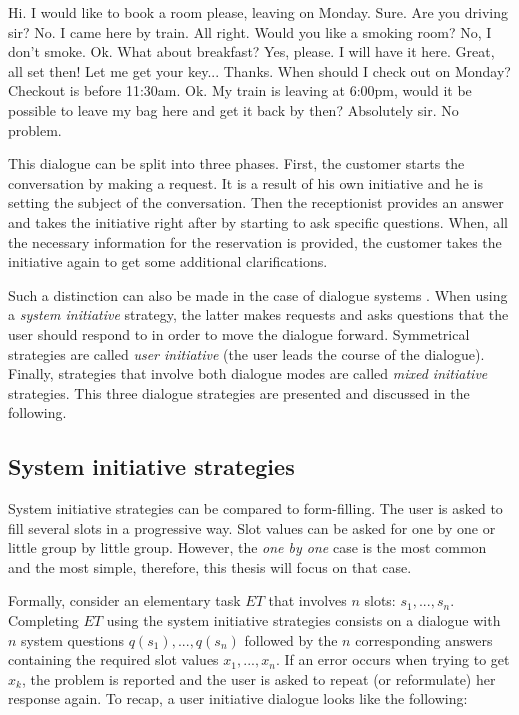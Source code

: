 	\begin{dialogue}
		 Hi. I would like to book a room please, leaving on Monday.
		 Sure. Are you driving sir?
		 No. I came here by train.
		 All right. Would you like a smoking room?
		 No, I don't smoke.
		 Ok. What about breakfast?
		 Yes, please. I will have it here.
		 Great, all set then! Let me get your key...
		 Thanks. When should I check out on Monday?
		 Checkout is before 11:30am.
		 Ok. My train is leaving at 6:00pm, would it be possible to leave my bag here and get it back by then?
		 Absolutely sir. No problem.
	\end{dialogue}

	This dialogue can be split into three phases. First, the customer starts the conversation by making a request. It is a result of his own initiative and he is setting the subject of the conversation. Then the receptionist provides an answer and takes the initiative right after by starting to ask specific questions. When, all the necessary information for the reservation is provided, the customer takes the initiative again to get some additional clarifications.
	
	Such a distinction can also be made in the case of dialogue systems \cite{Ferguson2007}. When using a \textit{system initiative} strategy, the latter makes requests and asks questions that the user should respond to in order to move the dialogue forward. Symmetrical strategies are called \textit{user initiative} (the user leads the course of the dialogue). Finally, strategies that involve both dialogue modes are called \textit{mixed initiative} strategies. This three dialogue strategies are presented and discussed in the following.
	
	\subsection{System initiative strategies}
	
		System initiative strategies can be compared to form-filling. The user is asked to fill several slots in a progressive way. Slot values can be asked for one by one or little group by little group. However, the \textit{one by one} case is the most common and the most simple, therefore, this thesis will focus on that case.
		
		Formally, consider an elementary task $ET$ that involves $n$ slots: $s_1, ..., s_n$. Completing $ET$ using the system initiative strategies consists on a dialogue with $n$ system questions $q(s_1),...,q(s_n)$ followed by the $n$ corresponding answers containing the required slot values $x_1,...,x_n$. If an error occurs when trying to get $x_k$, the problem is reported and the user is asked to repeat (or reformulate) her response again. To recap, a user initiative dialogue looks like the following:
		
